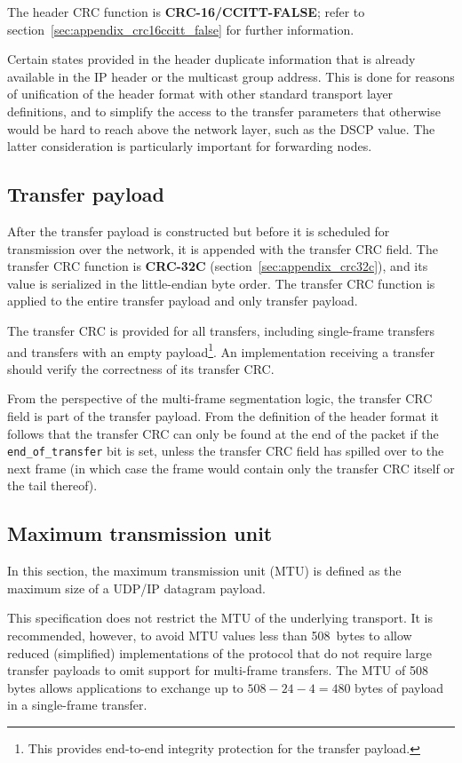 The header CRC function is \textbf{CRC-16/CCITT-FALSE};
refer to section~\ref{sec:appendix_crc16ccitt_false} for further information.

\begin{remark}
    Certain states provided in the header duplicate information that is already available in the IP header
    or the multicast group address.
    This is done for reasons of unification of the header format with other standard transport layer definitions,
    and to simplify the access to the transfer parameters that otherwise would be hard to reach above the
    network layer, such as the DSCP value.
    The latter consideration is particularly important for forwarding nodes.
\end{remark}

\subsection{Transfer payload}

After the transfer payload is constructed but before it is scheduled for transmission over the network,
it is appended with the transfer CRC field.
The transfer CRC function is \textbf{CRC-32C} (section~\ref{sec:appendix_crc32c}),
and its value is serialized in the little-endian byte order.
The transfer CRC function is applied to the entire transfer payload and only transfer payload.

The transfer CRC is provided for all transfers,
including single-frame transfers and transfers with an empty payload\footnote{%
    This provides end-to-end integrity protection for the transfer payload.
}.
An implementation receiving a transfer should verify the correctness of its transfer CRC.

\begin{remark}
    From the perspective of the multi-frame segmentation logic, the transfer CRC field is part of the transfer payload.
    From the definition of the header format it follows that the transfer CRC can only be found at the end of
    the packet if the \verb|end_of_transfer| bit is set,
    unless the transfer CRC field has spilled over to the next frame
    (in which case the frame would contain only the transfer CRC itself or the tail thereof).
\end{remark}

\subsection{Maximum transmission unit}

In this section, the maximum transmission unit (MTU) is defined as the maximum size of a UDP/IP datagram payload.

This specification does not restrict the MTU of the underlying transport.
It is recommended, however, to avoid MTU values less than 508~bytes to allow reduced (simplified) implementations
of the protocol that do not require large transfer payloads to omit support for multi-frame transfers.
The MTU of 508 bytes allows applications to exchange up to $508 - 24 - 4 = 480$ bytes of payload
in a single-frame transfer.
